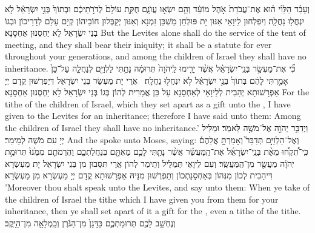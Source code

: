 {וְעָבַ֨ד הַלֵּוִ֜י ה֗וּא אֶת־עֲבֹדַת֙ אֹ֣הֶל מוֹעֵ֔ד וְהֵ֖ם יִשְׂא֣וּ עֲוֺנָ֑ם חֻקַּ֤ת עוֹלָם֙ לְדֹרֹ֣תֵיכֶ֔ם וּבְתוֹךְ֙ בְּנֵ֣י יִשְׂרָאֵ֔ל לֹ֥א יִנְחֲל֖וּ נַחֲלָֽה׃
}
{וְיִפְלְחוּן לֵיוָאֵי אִנּוּן יָת פּוּלְחַן מַשְׁכַּן זִמְנָא וְאִנּוּן יְקַבְּלוּן חוֹבֵיהוֹן קְיָם עָלַם לְדָרֵיכוֹן וּבְגוֹ בְנֵי יִשְׂרָאֵל לָא יַחְסְנוּן אַחְסָנָא׃}
{But the Levites alone shall do the service of the tent of meeting, and they shall bear their iniquity; it shall be a statute for ever throughout your generations, and among the children of Israel they shall have no inheritance.}{}
{כִּ֞י אֶת־מַעְשַׂ֣ר בְּנֵֽי־יִשְׂרָאֵ֗ל אֲשֶׁ֨ר יָרִ֤ימוּ לַֽיהֹוָה֙ תְּרוּמָ֔ה נָתַ֥תִּי לַלְוִיִּ֖ם לְנַחֲלָ֑ה עַל־כֵּן֙ אָמַ֣רְתִּי לָהֶ֔ם בְּתוֹךְ֙ בְּנֵ֣י יִשְׂרָאֵ֔ל לֹ֥א יִנְחֲל֖וּ נַחֲלָֽה׃ \petucha 
{}}
{אֲרֵי יָת מַעְשַׂר בְּנֵי יִשְׂרָאֵל דְּיַפְרְשׁוּן קֳדָם יְיָ אַפְרָשׁוּתָא יְהַבִית לְלֵיוָאֵי לְאַחְסָנָא עַל כֵּן אֲמַרִית לְהוֹן בְּגוֹ בְּנֵי יִשְׂרָאֵל לָא יַחְסְנוּן אַחְסָנָא׃}
{For the tithe of the children of Israel, which they set apart as a gift unto the \lord, I have given to the Levites for an inheritance; therefore I have said unto them: Among the children of Israel they shall have no inheritance.’}{}
{וַיְדַבֵּ֥ר יְהֹוָ֖ה אֶל־מֹשֶׁ֥ה לֵּאמֹֽר׃}
{וּמַלֵּיל יְיָ עִם מֹשֶׁה לְמֵימַר׃}
{And the \lord\space spoke unto Moses, saying:}{}
{וְאֶל־הַלְוִיִּ֣ם תְּדַבֵּר֮ וְאָמַרְתָּ֣ אֲלֵהֶם֒ כִּֽי־תִ֠קְח֠וּ מֵאֵ֨ת בְּנֵֽי־יִשְׂרָאֵ֜ל אֶת־הַֽמַּעֲשֵׂ֗ר אֲשֶׁ֨ר נָתַ֧תִּי לָכֶ֛ם מֵאִתָּ֖ם בְּנַחֲלַתְכֶ֑ם וַהֲרֵמֹתֶ֤ם מִמֶּ֙נּוּ֙ תְּרוּמַ֣ת יְהֹוָ֔ה מַעֲשֵׂ֖ר מִן־הַֽמַּעֲשֵֽׂר׃}
{וְעִם לֵיוָאֵי תְּמַלֵּיל וְתֵימַר לְהוֹן אֲרֵי תִּסְּבוּן מִן בְּנֵי יִשְׂרָאֵל יָת מַעְשְׂרָא דִּיהַבִית לְכוֹן מִנְּהוֹן בְּאַחְסָנַתְכוֹן וְתַפְרְשׁוּן מִנֵּיהּ אַפְרָשׁוּתָא קֳדָם יְיָ מַעְשְׂרָא מִן מַעְשְׂרָא׃}
{’Moreover thou shalt speak unto the Levites, and say unto them: When ye take of the children of Israel the tithe which I have given you from them for your inheritance, then ye shall set apart of it a gift for the \lord, even a tithe of the tithe.}{}
{וְנֶחְשַׁ֥ב לָכֶ֖ם תְּרוּמַתְכֶ֑ם כַּדָּגָן֙ מִן־הַגֹּ֔רֶן וְכַֽמְלֵאָ֖ה מִן־הַיָּֽקֶב׃
}
